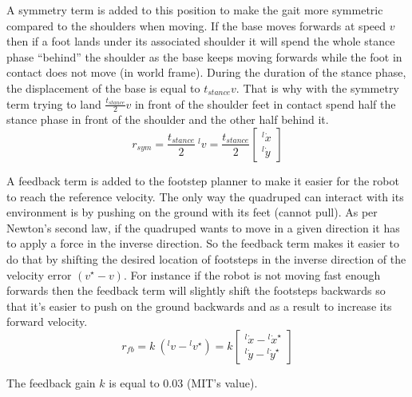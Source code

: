 \documentclass[a4paper,11pt]{article}
\begin{document}
A symmetry term is added to this position to make the gait more symmetric compared to the shoulders when moving. If the base moves forwards at speed $v$ then if a foot lands under its associated shoulder it will spend the whole stance phase ``behind'' the shoulder as the base keeps moving forwards while the foot in contact does not move (in world frame). During the duration of the stance phase, the displacement of the base is equal to $t_{stance} v$. That is why with the symmetry term trying to land $\frac{t_{stance}}{2} v$ in front of the shoulder feet in contact spend half the stance phase in front of the shoulder and the other half behind it.
\begin{equation}
{r}_{sym} = \frac{t_{stance}}{2} ~ {}^l\!v = \frac{t_{stance}}{2} \begin{bmatrix} {}^l\!\dot x \\ {}^l\!\dot y \end{bmatrix}
\end{equation}

A feedback term is added to the footstep planner to make it easier for the robot to reach the reference velocity. The only way the quadruped can interact with its environment is by pushing on the ground with its feet (cannot pull). As per Newton's second law, if the quadruped wants to move in a given direction it has to apply a force in the inverse direction. So the feedback term makes it easier to do that by shifting the desired location of footsteps in the inverse direction of the velocity error $(v^\star-v)$. For instance if the robot is not moving fast enough forwards then the feedback term will slightly shift the footsteps backwards so that it's easier to push on the ground backwards and as a result to increase its forward velocity.
\begin{equation}
{r}_{fb} = k ~ ({}^l\!v - {}^l\!v^\star) = k \begin{bmatrix} {}^l\!\dot x - {}^l\!\dot x^\star \\ {}^l\!\dot y - {}^l\!\dot y^\star \end{bmatrix}
\end{equation}

The feedback gain $k$ is equal to 0.03 (MIT's value).
\end{document}
